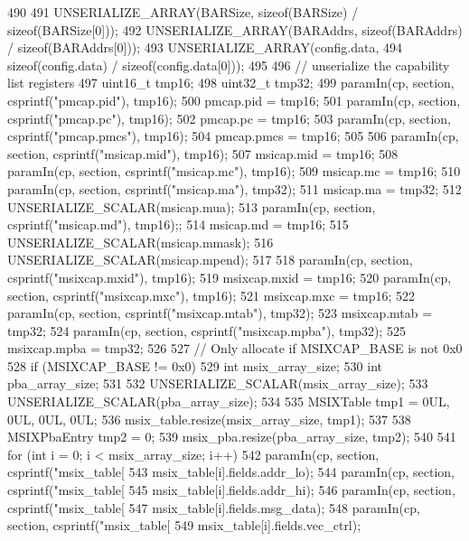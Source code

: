 \begin{DoxyCode}
490 {
491     UNSERIALIZE_ARRAY(BARSize, sizeof(BARSize) / sizeof(BARSize[0]));
492     UNSERIALIZE_ARRAY(BARAddrs, sizeof(BARAddrs) / sizeof(BARAddrs[0]));
493     UNSERIALIZE_ARRAY(config.data,
494                       sizeof(config.data) / sizeof(config.data[0]));
495 
496     // unserialize the capability list registers
497     uint16_t tmp16;
498     uint32_t tmp32;
499     paramIn(cp, section, csprintf("pmcap.pid"), tmp16);
500     pmcap.pid = tmp16;
501     paramIn(cp, section, csprintf("pmcap.pc"), tmp16);
502     pmcap.pc = tmp16;
503     paramIn(cp, section, csprintf("pmcap.pmcs"), tmp16);
504     pmcap.pmcs = tmp16;
505 
506     paramIn(cp, section, csprintf("msicap.mid"), tmp16);
507     msicap.mid = tmp16;
508     paramIn(cp, section, csprintf("msicap.mc"), tmp16);
509     msicap.mc = tmp16;
510     paramIn(cp, section, csprintf("msicap.ma"), tmp32);
511     msicap.ma = tmp32;
512     UNSERIALIZE_SCALAR(msicap.mua);
513     paramIn(cp, section, csprintf("msicap.md"), tmp16);;
514     msicap.md = tmp16;
515     UNSERIALIZE_SCALAR(msicap.mmask);
516     UNSERIALIZE_SCALAR(msicap.mpend);
517 
518     paramIn(cp, section, csprintf("msixcap.mxid"), tmp16);
519     msixcap.mxid = tmp16;
520     paramIn(cp, section, csprintf("msixcap.mxc"), tmp16);
521     msixcap.mxc = tmp16;
522     paramIn(cp, section, csprintf("msixcap.mtab"), tmp32);
523     msixcap.mtab = tmp32;
524     paramIn(cp, section, csprintf("msixcap.mpba"), tmp32);
525     msixcap.mpba = tmp32;
526 
527     // Only allocate if MSIXCAP_BASE is not 0x0
528     if (MSIXCAP_BASE != 0x0) {
529         int msix_array_size;
530         int pba_array_size;
531 
532         UNSERIALIZE_SCALAR(msix_array_size);
533         UNSERIALIZE_SCALAR(pba_array_size);
534 
535         MSIXTable tmp1 = {{0UL, 0UL, 0UL, 0UL}};
536         msix_table.resize(msix_array_size, tmp1);
537 
538         MSIXPbaEntry tmp2 = {0};
539         msix_pba.resize(pba_array_size, tmp2);
540 
541         for (int i = 0; i < msix_array_size; i++) {
542             paramIn(cp, section, csprintf("msix_table[%
543                     msix_table[i].fields.addr_lo);
544             paramIn(cp, section, csprintf("msix_table[%
545                     msix_table[i].fields.addr_hi);
546             paramIn(cp, section, csprintf("msix_table[%
547                     msix_table[i].fields.msg_data);
548             paramIn(cp, section, csprintf("msix_table[%
549                     msix_table[i].fields.vec_ctrl);
}}}
\end{DoxyCode}
